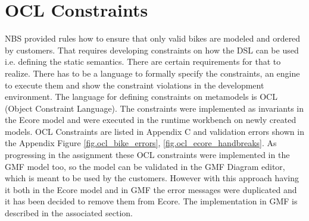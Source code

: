 \section{OCL Constraints}
\label{sec.ocl_constraints}

\noindent
NBS provided rules how to ensure that only valid bikes are modeled and 
ordered by customers. That requires developing constraints on how the 
DSL can be used i.e. defining the static semantics. There are certain 
requirements for that to realize. There has to be a language to 
formally specify the constraints, an engine to execute them and show 
the constraint violations in the development environment. The language 
for defining constraints on metamodels is OCL (Object Constraint 
Language). 
\noindent The constraints were implemented as invariants in the Ecore 
model and were executed in the runtime workbench on newly created models. 
OCL Constraints are listed in Appendix C and validation errors shown 
in the Appendix Figure \ref{fig.ocl_bike_errors}, \ref{fig.ocl_ecore_handbreaks}. 
\noindent As progressing in the assignment these OCL 
constraints were implemented in the GMF model too, so the 
model can be validated in the GMF Diagram editor, which is meant 
to be used by the customers. However with this approach having it 
both in the Ecore model and in GMF the error messages were duplicated 
and it has been decided to remove them from Ecore. The implementation 
in GMF is described in the associated section.
